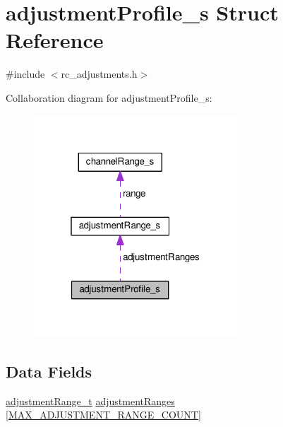 \hypertarget{structadjustmentProfile__s}{\section{adjustment\+Profile\+\_\+s Struct Reference}
\label{structadjustmentProfile__s}
}


{\ttfamily \#include $<$rc\+\_\+adjustments.\+h$>$}



Collaboration diagram for adjustment\+Profile\+\_\+s\+:\nopagebreak
\begin{figure}[H]
\begin{center}
\leavevmode
\includegraphics[width=217pt]{structadjustmentProfile__s__coll__graph}
\end{center}
\end{figure}
\subsection*{Data Fields}
\begin{DoxyCompactItemize}
\item 
\hyperlink{config_2rc__adjustments_8h_aa60372a229c7396974de1fbd7f36deee}{adjustment\+Range\+\_\+t} \hyperlink{structadjustmentProfile__s_a8b8d07c4b71ba295d73b16481768283a}{adjustment\+Ranges} \mbox{[}\hyperlink{config_2rc__adjustments_8h_a8b154a1fcc1c63c047a7e6909dacfd97}{M\+A\+X\+\_\+\+A\+D\+J\+U\+S\+T\+M\+E\+N\+T\+\_\+\+R\+A\+N\+G\+E\+\_\+\+C\+O\+U\+N\+T}\mbox{]}
\end{DoxyCompactItemize}


